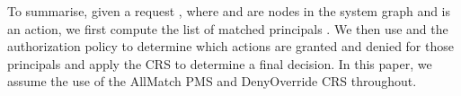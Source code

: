 \documentclass{article}
\newtheorem{definition}{Definition}
\begin{document}
To summarise, given a request , where  and  are nodes in the system graph and  is an action, we first compute the list of matched principals .
We then use  and the authorization policy to determine which actions are granted and denied for those principals and apply the CRS to determine a final decision.
In this paper, we assume the use of the \textsf{AllMatch} PMS and \textsf{DenyOverride} CRS throughout.
\begin{comment} \section{Negative Principal-Matching Conditions}\label{sec:negative-pmc}
In order to support more complex principal matching, and thereby be able to support useful constraints such as separation of duty and Chinese Wall (see Section~\ref{sec:audit}), we modify the RPPM model's principal-matching rule to support a \emph{negative principal-matching condition}.
Principals within these modified rules may only be matched when both the positive (original) principal-matching condition and negative principal-matching condition are taken into account.

\begin{definition}
     Let  be a set of \emph{authorization principals} and let  be a set of relationship labels.
     A \emph{principal-matching rule} has the form , where  is an authorization principal and \ppmc and \npmc are either path conditions defined on  or the special symbols  or , respectively.
     The path condition \ppmc is called a \emph{positive principal-matching condition} whilst the path condition \npmc is called a \emph{negative principal-matching condition}.
     A \emph{principal-matching policy}  is a list of principal-matching rules.
\end{definition}

Informally, principal-matching rules now support two principal-matching conditions, the second of which must \emph{not} be satisfied for the principal to apply.
Principal-matching rules of the form  only require the positive principal-matching condition \ppmc to be satisfied for the principal to apply.
(For simplicity of notation and backwards compatibility we interpret rules of the form  as a short-hand for .)
Those of the form  only require that the negative principal-matching condition \npmc not be satisfied for the principal to apply.
Rules of the form  require that both \ppmc is satisfied and \npmc not be satisfied for the principal to apply.
Finally a single optional default principal-matching rule may still be utilised, now taking the form .


\end{comment}
\end{document}

